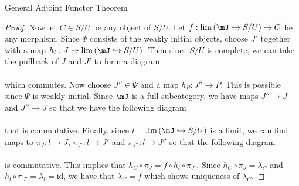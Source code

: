 \documentclass[a4paper]{article}
\begin{document}
\begin{thm}{General Adjoint Functor Theorem}{}
\begin{proof}
Now let $C\in S/U$ be any object of $S/U$. Let $f:\lim\left(\mJ\hookrightarrow S/U\right)\to C$ be any morphism. Since $\Psi$ consists of the weakly initial objects, choose $J'$ together with a map $h_l:J\to\lim\left(\mJ\hookrightarrow S/U\right)$. Then since $S/U$ is complete, we can take the pullback of $J$ and $J'$ to form a diagram \\
\\
which commutes. Now choose $J''\in\Psi$ and a map $h_P:J''\to P$. This is possible since $\Psi$ is weakly initial. Since $\mJ$ is a full subcategory, we have maps $J''\to J$ and $J''\to J$ so that we have the following diagram \\
\\
that is commutative. Finally, since $l=\lim\left(\mJ\hookrightarrow S/U\right)$ is a limit, we can find maps to $\pi_J:l\to J$, $\pi_{J'}:l\to J'$ and $\pi_{J''}:l\to J''$ so that the following diagram \\
\\
is commutative. This implies that $h_C\circ\pi_J=f\circ h_l\circ\pi_{J'}$. Since $h_C\circ\pi_J=\lambda_C$ and $h_l\circ\pi_{J'}=\lambda_l=\text{id}$, we have that $\lambda_C=f$ which shows uniqueness of $\lambda_C$. 
\end{proof}
\end{thm}
\end{document}
